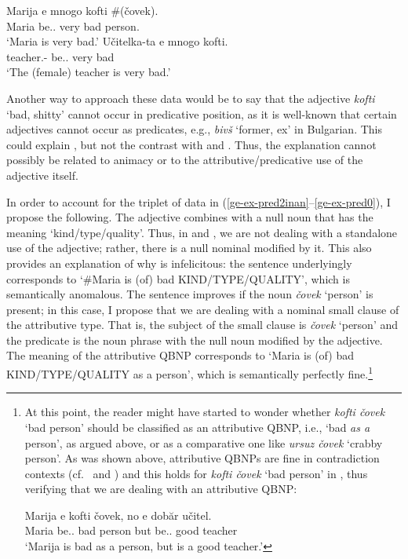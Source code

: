 \documentclass[output=paper]{langscibook}
\begin{document}
\ea \label{ge-ex-pred0}
\ea \label{ge-ex-pred1}
\gll  Marija e mnogo kofti \#(\v{c}ovek).\\
Maria be.\Prs{}.\Tsg{} very bad \phantom{\#(}person.\M{}\\
\glt `Maria is very bad.'
\ex \label{ge-ex-pred2}
\gll  U\v{c}itelka-ta e mnogo kofti.\\
teacher.\F{}-\Def{} be.\Prs{}.\Tsg{} very bad \\
\glt `The (female) teacher is very bad.'
\z
\z

\noindent Another way to approach these data would be to say that the adjective \emph{kofti} `bad, shitty' cannot occur in predicative position, as it is well-known that certain adjectives cannot occur as predicates, e.g., \emph{biv\v{s}} `former, ex' in Bulgarian. This could explain , but not the contrast with  and . Thus, the explanation cannot possibly be related to animacy or to the attributive/predicative use of the adjective itself.

In order to account for the triplet of data in (\ref{ge-ex-pred2inan}--\ref{ge-ex-pred0}), I propose the following. The adjective combines with a null noun that has the meaning `kind\slash type\slash quality'. Thus, in  and , we are not dealing with a standalone use of the adjective; rather, there is a null nominal modified by it. This also provides an explanation of why  is infelicitous: the sentence underlyingly corresponds to `\#Maria is (of) bad KIND/TYPE/QUALITY', which is semantically anomalous. The sentence improves if the noun \emph{\v{c}ovek} `person' is present; in this case, I propose that we are dealing with a nominal small clause of the attributive type. That is, the subject of the small clause is \emph{\v{c}ovek} `person' and the predicate is the noun phrase with the null noun modified by the adjective. The meaning of the attributive QBNP corresponds to `Maria is (of) bad KIND/TYPE/QUALITY as a person', which is semantically perfectly fine.\footnote{At this point, the reader might have started to wonder whether \emph{kofti \v{c}ovek} `bad person' should be classified as an attributive QBNP, i.e., `bad \emph{as a} person', as argued above, or as a comparative one like \emph{ursuz \v{c}ovek} `crabby person'. As was shown above, attributive QBNPs are fine in contradiction contexts (cf.\  and ) and this holds for \emph{kofti \v{c}ovek} `bad person' in , thus verifying that we are dealing with an attributive QBNP:

\ea \label{ge-ex-bg-contra2}
\gll Marija e kofti \v{c}ovek, no e dob\u{a}r u\v{c}itel. \\
Maria be.\Prs{}.\Tsg{} bad person but be.\Prs{}.\Tsg{} good teacher \\
\glt `Marija is bad as a person, but is a good teacher.'
\z}
\end{document}
